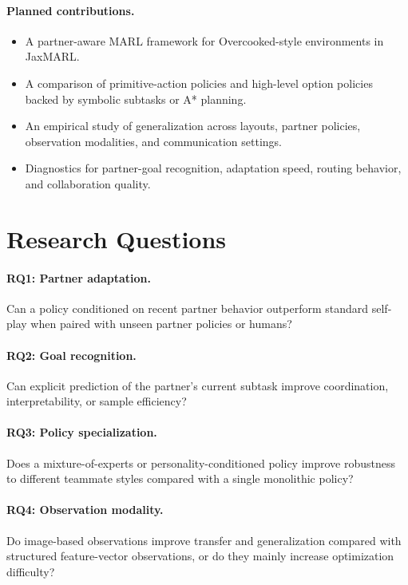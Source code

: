 \documentclass[letterpaper]{article} %
\begin{document}
\paragraph{Planned contributions.}
\begin{itemize}
    \item A partner-aware MARL framework for Overcooked-style environments in JaxMARL.
    \item A comparison of primitive-action policies and high-level option policies backed by symbolic subtasks or A* planning.
    \item An empirical study of generalization across layouts, partner policies, observation modalities, and communication settings.
    \item Diagnostics for partner-goal recognition, adaptation speed, routing behavior, and collaboration quality.
\end{itemize}

\section{Research Questions}

\paragraph{RQ1: Partner adaptation.}
Can a policy conditioned on recent partner behavior outperform standard self-play when paired with unseen partner policies or humans?

\paragraph{RQ2: Goal recognition.}
Can explicit prediction of the partner's current subtask improve coordination, interpretability, or sample efficiency?

\paragraph{RQ3: Policy specialization.}
Does a mixture-of-experts or personality-conditioned policy improve robustness to different teammate styles compared with a single monolithic policy?

\paragraph{RQ4: Observation modality.}
Do image-based observations improve transfer and generalization compared with structured feature-vector observations, or do they mainly increase optimization difficulty?
\end{document}
